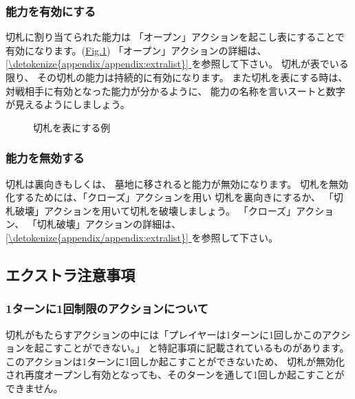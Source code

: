 \documentclass[letterpaper,10pt,dvipdfmx]{sphinxmanual}
\begin{document}
\subsubsection{能力を有効にする}
\label{\detokenize{common/common:id40}}
\sphinxAtStartPar
切札に割り当てられた能力は
「オープン」アクションを起こし表にすることで有効になります。(\hyperref[\detokenize{common/common:trump-open}]{Fig.\@ \ref{\detokenize{common/common:trump-open}}})
「オープン」アクションの詳細は、 \hyperref[\detokenize{appendix/appendix:extralist}]{\ref{\detokenize{appendix/appendix:extralist}} } を参照して下さい。
切札が表でいる限り、
その切札の能力は持続的に有効になります。
また切札を表にする時は、
対戦相手に有効となった能力が分かるように、
能力の名称を言いスートと数字が見えるようにしましょう。

\begin{figure}[htbp]
\centering
\capstart

\noindent{}
\caption{切札を表にする例}\label{\detokenize{common/common:id59}}\label{\detokenize{common/common:trump-open}}\end{figure}


\subsubsection{能力を無効する}
\label{\detokenize{common/common:id41}}
\sphinxAtStartPar
切札は裏向きもしくは、
墓地に移されると能力が無効になります。
切札を無効化するためには、「クローズ」アクションを用い
切札を裏向きにするか、
「切札破壊」アクションを用いて切札を破壊しましょう。
「クローズ」アクション、
「切札破壊」アクションの詳細は、 \hyperref[\detokenize{appendix/appendix:extralist}]{\ref{\detokenize{appendix/appendix:extralist}} } を参照して下さい。


\subsection{エクストラ注意事項}
\label{\detokenize{common/common:id42}}

\subsubsection{1ターンに1回制限のアクションについて}
\label{\detokenize{common/common:id43}}
\sphinxAtStartPar
切札がもたらすアクションの中には「プレイヤーは1ターンに1回しかこのアクションを起こすことができない。」
と特記事項に記載されているものがあります。
このアクションは1ターンに1回しか起こすことができないため、
切札が無効化され再度オープンし有効となっても、そのターンを通して1回しか起こすことができません。
\end{document}
